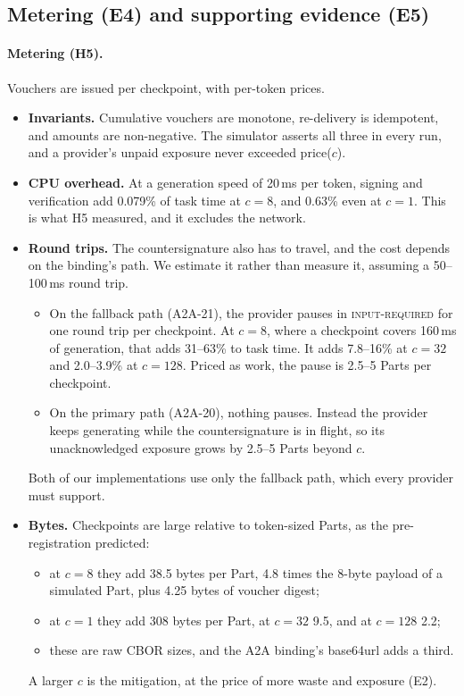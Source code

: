 \subsection{Metering (E4) and supporting evidence (E5)}
\label{sec:eval-meter}
\paragraph{Metering (H5).}
Vouchers are issued per checkpoint, with per-token prices.
\begin{itemize}
\item \textbf{Invariants.} Cumulative vouchers are monotone, re-delivery
  is idempotent, and amounts are non-negative. The simulator asserts all
  three in every run, and a provider's unpaid exposure never exceeded
  price($c$).
\item \textbf{CPU overhead.} At a generation speed of 20\,ms per token,
  \sys{} signing and verification add 0.079\% of task time at $c{=}8$,
  and 0.63\% even at $c{=}1$. This is what H5 measured, and it excludes
  the network.
\item \textbf{Round trips.} The countersignature also has to travel, and
  the cost depends on the binding's path. We estimate it rather than
  measure it, assuming a 50--100\,ms round trip.
  \begin{itemize}
  \item On the fallback path (A2A-21), the provider pauses in
    \textsc{input-required} for one round trip per checkpoint. At
    $c{=}8$, where a checkpoint covers 160\,ms of generation, that adds
    31--63\% to task time. It adds 7.8--16\% at $c{=}32$ and 2.0--3.9\%
    at $c{=}128$. Priced as work, the pause is 2.5--5 Parts per
    checkpoint.
  \item On the primary path (A2A-20), nothing pauses. Instead the
    provider keeps generating while the countersignature is in flight,
    so its unacknowledged exposure grows by 2.5--5 Parts beyond $c$.
  \end{itemize}
  Both of our implementations use only the fallback path, which every
  provider must support.
\item \textbf{Bytes.} Checkpoints are large relative to token-sized
  Parts, as the pre-registration predicted:
  \begin{itemize}
  \item at $c{=}8$ they add 38.5 bytes per Part, 4.8 times the 8-byte
    payload of a simulated Part, plus 4.25 bytes of voucher digest;
  \item at $c{=}1$ they add 308 bytes per Part, at $c{=}32$ 9.5, and at
    $c{=}128$ 2.2;
  \item these are raw CBOR sizes, and the A2A binding's base64url adds a
    third.
  \end{itemize}
  A larger $c$ is the mitigation, at the price of more waste and exposure
  (E2).
\end{itemize}


